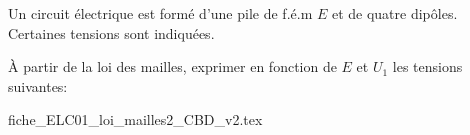 \hauteurLargeurCadreReponse		{7mm}{30mm}
\typeEntrainement				{} %
\initialisationEntrainement

                                \initialisationPartieGauche %
Un circuit électrique est formé d'une pile de f.é.m $E$ et de quatre dipôles. Certaines tensions sont indiquées.

À partir de la loi des mailles, exprimer en fonction de $E$ et $U_1$ les tensions suivantes:
                                \initialisationPartieDroite %
\begin{center}
{fiche_ELC01_loi_mailles2_CBD_v2.tex}
\end{center}
                               \finalisationDuPartageDePage %

\medskip
\debutEntrainement


